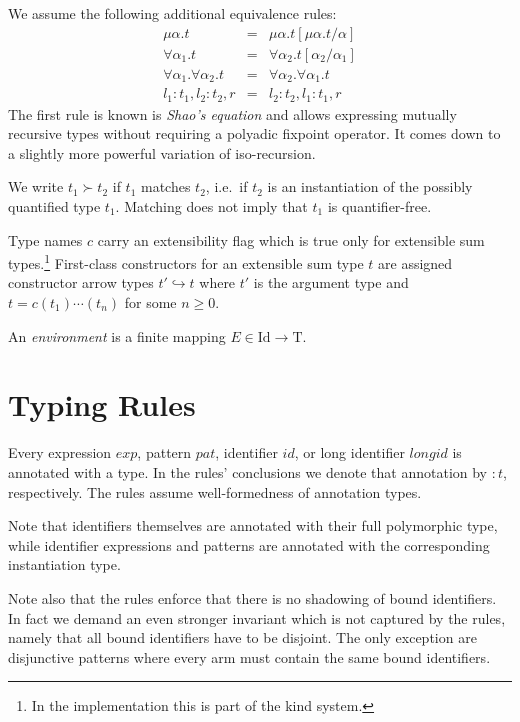 \documentclass[twoside]{article}
\newcommand{\conarrow}{\hookrightarrow}
\newcommand{\x}[1]{\mathit{#1}}
\newcommand{\f}[1]{\mbox{#1}}
\newcommand{\id}{\x{id}}
\newcommand{\longid}{\x{longid}}
\renewcommand{\exp}{\x{exp}}
\newcommand{\pat}{\x{pat}}
\begin{document}
We assume the following additional equivalence rules:
\begin{eqnarray*}
\mu \alpha.t &=& \mu \alpha.t[\mu \alpha.t/\alpha] \\
\forall \alpha_1.t &=& \forall \alpha_2.t[\alpha_2/\alpha_1] \\
\forall \alpha_1.\forall \alpha_2.t &=& \forall \alpha_2.\forall \alpha_1.t \\
l_1:t_1,l_2:t_2,r &=& l_2:t_2,l_1:t_1,r
\end{eqnarray*}
The first rule is known is {\em Shao's equation} and allows expressing mutually recursive types without requiring a polyadic fixpoint operator. It comes down to a slightly more powerful variation of iso-recursion.

We write $t_1 \succ t_2$ if $t_1$ matches $t_2$, i.e.\ if $t_2$ is an instantiation of the possibly quantified type $t_1$. Matching does not imply that $t_1$ is quantifier-free.

Type names $c$ carry an extensibility flag which is true only for extensible sum types.\footnote{In the implementation this is part of the kind system.} First-class constructors for an extensible sum type $t$ are assigned constructor arrow types $t' \conarrow t$ where $t'$ is the argument type and $t = c(t_1)\cdots(t_n)$ for some $n\geq0$.

An {\em environment} is a finite mapping $E \in \f{Id}\to\f{T}$.


\section{Typing Rules}
\label{typing}

Every expression $\exp$, pattern $\pat$, identifier $\id$, or long identifier $\longid$ is annotated with a type. In the rules' conclusions we denote that annotation by $:t$, respectively. The rules assume well-formedness of annotation types.

Note that identifiers themselves are annotated with their full polymorphic type, while identifier expressions and patterns are annotated with the corresponding instantiation type.

Note also that the rules enforce that there is no shadowing of bound identifiers. In fact we demand an even stronger invariant which is not captured by the rules, namely that all bound identifiers have to be disjoint. The only exception are disjunctive patterns where every arm must contain the same bound identifiers.
\end{document}
